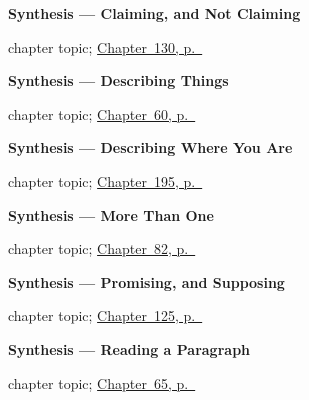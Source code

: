 \noindent\begin{minipage}[t]{\linewidth}
\raggedright
\textbf{Synthesis --- Claiming, and Not Claiming}\par
\footnotesize chapter topic; \hyperref[ch:spanish-synthesis-subjuntivo]{Chapter~130, p.~\pageref*{ch:spanish-synthesis-subjuntivo}}
\end{minipage}\par\smallskip

\noindent\begin{minipage}[t]{\linewidth}
\raggedright
\textbf{Synthesis --- Describing Things}\par
\footnotesize chapter topic; \hyperref[ch:sintesis-describir]{Chapter~60, p.~\pageref*{ch:sintesis-describir}}
\end{minipage}\par\smallskip

\noindent\begin{minipage}[t]{\linewidth}
\raggedright
\textbf{Synthesis --- Describing Where You Are}\par
\footnotesize chapter topic; \hyperref[ch:synthesis-hay]{Chapter~195, p.~\pageref*{ch:synthesis-hay}}
\end{minipage}\par\smallskip

\noindent\begin{minipage}[t]{\linewidth}
\raggedright
\textbf{Synthesis --- More Than One}\par
\footnotesize chapter topic; \hyperref[ch:synthesis-more-than-one]{Chapter~82, p.~\pageref*{ch:synthesis-more-than-one}}
\end{minipage}\par\smallskip

\noindent\begin{minipage}[t]{\linewidth}
\raggedright
\textbf{Synthesis --- Promising, and Supposing}\par
\footnotesize chapter topic; \hyperref[ch:spanish-synthesis-future-conditional]{Chapter~125, p.~\pageref*{ch:spanish-synthesis-future-conditional}}
\end{minipage}\par\smallskip

\noindent\begin{minipage}[t]{\linewidth}
\raggedright
\textbf{Synthesis --- Reading a Paragraph}\par
\footnotesize chapter topic; \hyperref[ch:sintesis-ocho]{Chapter~65, p.~\pageref*{ch:sintesis-ocho}}
\end{minipage}\par\smallskip

